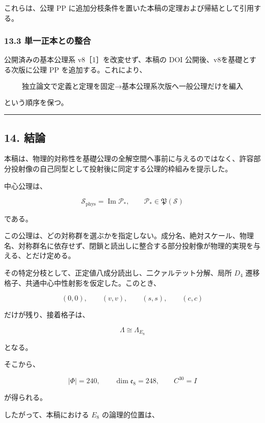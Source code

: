 \documentclass[
  a4paper,
  ja=minimal,
  xelatex,
  paragraph-mark={},
]{bxjsarticle}
\begin{document}
これらは、公理 PP
に追加分枝条件を置いた本稿の定理および帰結として引用する。

\subsubsection{13.3
単一正本との整合}\label{ux5358ux4e00ux6b63ux672cux3068ux306eux6574ux5408}

公開済みの基本公理系 v8［1］を改変せず、本稿の DOI
公開後、v8を基礎とする次版に公理 PP を追加する。これにより、

\[
\text{独立論文で定義と定理を固定}
\longrightarrow
\text{基本公理系次版へ一般公理だけを編入}
\]

という順序を保つ。

\begin{center}\rule{0.5\linewidth}{0.5pt}\end{center}

\subsection{14. 結論}\label{ux7d50ux8ad6}

本稿は、物理的対称性を基礎公理の全解空間へ事前に与えるのではなく、許容部分投射像の自己同型として投射後に同定する公理的枠組みを提示した。

中心公理は、

\[
\boxed{
\mathscr S_{\mathrm{phys}}
{}=
\operatorname{Im}\mathcal P_*,
\qquad
\mathcal P_*
\in
\mathfrak P(\mathscr S)
}
\]

である。

この公理は、どの対称群を選ぶかを指定しない。成分名、絶対スケール、物理名、対称群名に依存せず、閉鎖と読出しに整合する部分投射像が物理的実現を与える、とだけ定める。

その特定分枝として、正定値八成分読出し、二クァルテット分解、局所 \(D_4\)
遷移格子、共通中心中性射影を仮定した。このとき、

\[
\boxed{
(0,0),
\qquad
(v,v),
\qquad
(s,s),
\qquad
(c,c)
}
\]

だけが残り、接着格子は、

\[
\boxed{
\Lambda
\cong
\Lambda_{E_8}
}
\]

となる。

そこから、

\[
\boxed{
|\Phi|
{}=240,
\qquad
\dim\mathfrak e_8
{}=248,
\qquad
C^{30}
{}=I
}
\]

が得られる。

したがって、本稿における \(E_8\) の論理的位置は、
\end{document}
